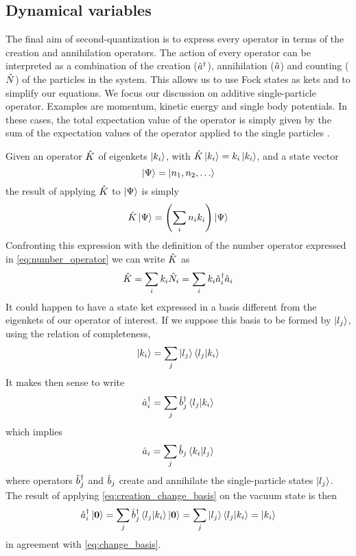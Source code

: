 \subsection{Dynamical variables}
The final aim of second-quantization is to express every operator in terms of the creation and annihilation operators. The action of every operator can be interpreted as a combination of the creation ($\hat{a}^\dagger$), annihilation ($\hat{a}$) and counting ($\hat{N}$) of the particles in the system. This allows us to use Fock states as kets and to simplify our equations.
We focus our discussion on additive single-particle operator. Examples are momentum, kinetic energy and single body potentials. In these cases, the total expectation value of the operator is simply given by the sum of the expectation values of the operator applied to the single particles \cite{sakurai2020}.

Given an operator $\hat{K}$ of eigenkets $\ket{k_i}$, with $\hat{K} \ket{k_i} = k_i\ket{k_i}$, and a state vector
\begin{equation}
    \ket{\Psi} = \ket{n_1, n_2, \dots}
\end{equation}
the result of applying $\hat{K}$ to $\ket{\Psi}$ is simply
\begin{equation}
    \hat{K}\ket{\Psi} = \left( \sum_i n_i k_i \right) \ket{\Psi}
\end{equation}
Confronting this expression with the definition of the number operator expressed in \cref{eq:number_operator} we can write $\hat{K}$ as
\begin{equation}
    \label{eq:creation_annihilation_operator}
    \hat{K} = \sum_i k_i \hat{N}_i = \sum_i k_i  \hat{a}^\dagger_i\hat{a}_i
\end{equation}
It could happen to have a state ket expressed in a basis different from the eigenkets of our operator of interest. If we suppose this basis to be formed by $\ket{l_j}$, using the relation of completeness,
\begin{equation} \label{eq:change_basis}
    \ket{k_i} = \sum_j \ket{l_j} \braket{l_j}{k_i}
\end{equation}
It makes then sense to write
\begin{equation} \label{eq:creation_change_basis}
    \hat{a}^\dagger_i = \sum_j \hat{b}^\dagger_j \braket{l_j}{k_i}
\end{equation}
which implies
\begin{equation}
    \hat{a}_i = \sum_j \hat{b}_j \braket{k_i}{l_j}
\end{equation}
where operators $\hat{b}^\dagger_j$ and $\hat{b}_j$ create and annihilate the single-particle states $\ket{l_j}$. The result of applying \cref{eq:creation_change_basis} on the vacuum state is then
\begin{equation}
    \hat{a}^\dagger_i \ket{\mathbf{\boldsymbol{0}}} = \sum_j \hat{b}^\dagger_j \braket{l_j}{k_i} \ket{\mathbf{\boldsymbol{0}}} = \sum_j \ket{l_j} \braket{l_j}{k_i} = \ket{k_i}
\end{equation}
in agreement with \cref{eq:change_basis}.

